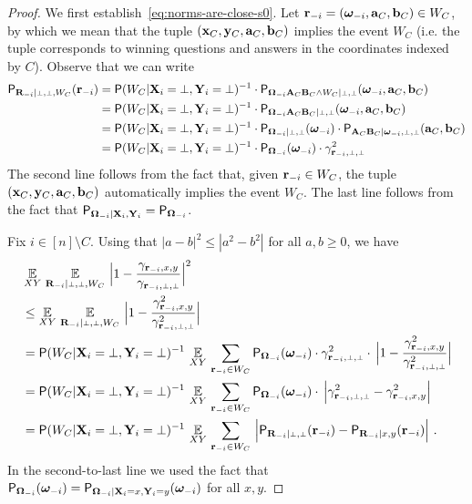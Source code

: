 \begin{proof}
We first establish~\eqref{eq:norms-are-close-s0}. Let $\mathbf{r}_{-i} = ({\boldsymbol{\omega}}_{-i},\mathbf{a}_C,\mathbf{b}_C) \in W_C$, by which we mean that the tuple $(\mathbf{x}_C,\mathbf{y}_C,\mathbf{a}_C,\mathbf{b}_C)$ implies the event $W_C$ (i.e. the tuple corresponds to winning questions and answers in the coordinates indexed by $C$). Observe that we can write
	\begin{align*}
		\P_{\bR_\mi | \dummy, \dummy, W_C}(\br_\mi) &= \P(W_C |  \bX_i = \dummy, \bY_i = \dummy)^{-1} \cdot \P_{\bOmega_\mi \bA_C \bB_C \wedge W_C | \dummy, \dummy}(\bomega_\mi,\ba_C,\bb_C) \\
		&= \P(W_C | \bX_i = \dummy, \bY_i = \dummy)^{-1} \cdot \P_{\bOmega_\mi \bA_C \bB_C | \dummy, \dummy}(\bomega_\mi,\ba_C,\bb_C) \\
		&= \P(W_C | \bX_i = \dummy, \bY_i = \dummy)^{-1} \cdot \P_{\bOmega_\mi | \dummy, \dummy}(\bomega_\mi) \cdot \P_{\bA_C \bB_C | \bomega_\mi,\dummy, \dummy}(\ba_C,\bb_C) \\
		&= \P(W_C |\bX_i = \dummy, \bY_i = \dummy)^{-1} \cdot \P_{\bOmega_\mi}(\bomega_\mi) \cdot \gamma_{\br_\mi,\dummy,\dummy}^2 
	\end{align*}
	The second line follows from the fact that, given $\mathbf{r}_{-i} \in W_C$, the tuple $(\mathbf{x}_C,\mathbf{y}_C,\mathbf{a}_C,\mathbf{b}_C)$ automatically implies the event $W_C$. The last line follows from the fact that $\mathsf{P}_{{\boldsymbol{\Omega}}_{-i} | \mathbf{X}_i,\mathbf{Y}_i} = \mathsf{P}_{{\boldsymbol{\Omega}}_{-i}}$.
	
	Fix $i \in [n] \setminus C$. Using that $|a - b|^2 \leq |a^2 - b^2|$ for all $a,b \geq 0$, we have
	\begin{align}
		&\Ex_{XY} \, \Ex_{\bR_\mi | \dummy, \dummy, W_C} \, \Big | 1 - \frac{\gamma_{\br_\mi, x,y}}{\gamma_{\br_\mi,\dummy,\dummy}} \Big |^2 \notag \\
		&\leq \Ex_{XY} \, \Ex_{\bR_\mi | \dummy, \dummy, W_C} \, \Big | 1 - \frac{\gamma_{\br_\mi, x,y}^2}{\gamma_{\br_\mi,\dummy,\dummy}^2} \Big | \notag \\
		&= \P(W_C |\bX_i = \dummy, \bY_i = \dummy)^{-1} \,\Ex_{XY} \,\sum_{\br_\mi \in W_C} \P_{\bOmega_\mi}(\bomega_\mi) \cdot \gamma_{\br_\mi,\dummy,\dummy}^2 \cdot \, \Big | 1 - \frac{\gamma_{\br_\mi, x,y}^2}{\gamma_{\br_\mi,\dummy,\dummy}^2} \Big | \notag \\
		&= \P(W_C |\bX_i = \dummy, \bY_i = \dummy)^{-1} \, \Ex_{XY} \,\sum_{\br_\mi \in W_C} \P_{\bOmega_\mi}(\bomega_\mi) \cdot \, \Big | \gamma_{\br_\mi,\dummy,\dummy}^2 - \gamma_{\br_\mi, x,y}^2 \Big | \notag \\
		&= \P(W_C |\bX_i = \dummy, \bY_i = \dummy)^{-1} \, \Ex_{XY} \,\sum_{\br_\mi \in W_C} \, \Big | \P_{\bR_\mi | \dummy,\dummy}(\br_\mi) - \P_{\bR_\mi | x,y}(\br_\mi) \Big |~. \label{eq:norms-are-close-0a}
	\end{align}
	In the second-to-last line we used the fact that $\mathsf{P}_{{\boldsymbol{\Omega}}_{-i}}({\boldsymbol{\omega}}_{-i}) = \mathsf{P}_{{\boldsymbol{\Omega}}_{-i} | \mathbf{X}_i = x, \mathbf{Y}_i = y}({\boldsymbol{\omega}}_{-i})$ for all $x,y$. 


\end{proof}
